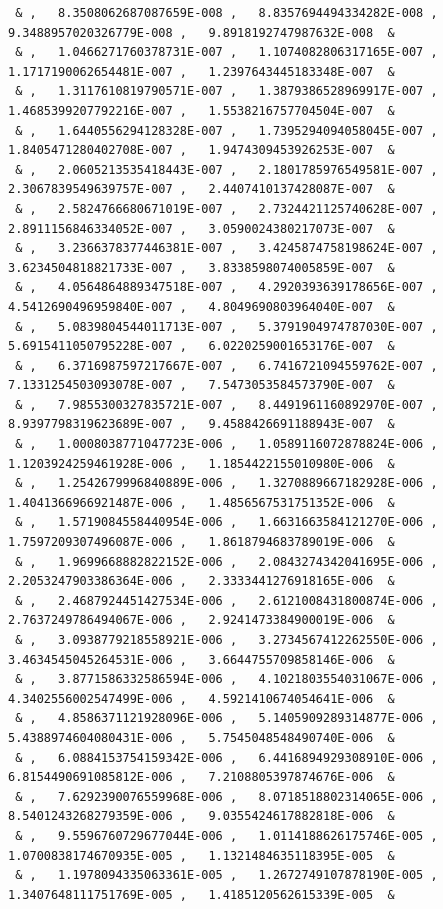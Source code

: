 \documentclass[a4paper,10pt]{report}
\begin{document}
{\begin{verbatim}
 & ,   8.3508062687087659E-008 ,   8.8357694494334282E-008 ,   9.3488957020326779E-008 ,   9.8918192747987632E-008  &
 & ,   1.0466271760378731E-007 ,   1.1074082806317165E-007 ,   1.1717190062654481E-007 ,   1.2397643445183348E-007  &
 & ,   1.3117610819790571E-007 ,   1.3879386528969917E-007 ,   1.4685399207792216E-007 ,   1.5538216757704504E-007  &
 & ,   1.6440556294128328E-007 ,   1.7395294094058045E-007 ,   1.8405471280402708E-007 ,   1.9474309453926253E-007  &
 & ,   2.0605213535418443E-007 ,   2.1801785976549581E-007 ,   2.3067839549639757E-007 ,   2.4407410137428087E-007  &
 & ,   2.5824766680671019E-007 ,   2.7324421125740628E-007 ,   2.8911156846334052E-007 ,   3.0590024380217073E-007  &
 & ,   3.2366378377446381E-007 ,   3.4245874758198624E-007 ,   3.6234504818821733E-007 ,   3.8338598074005859E-007  &
 & ,   4.0564864889347518E-007 ,   4.2920393639178656E-007 ,   4.5412690496959840E-007 ,   4.8049690803964040E-007  &
 & ,   5.0839804544011713E-007 ,   5.3791904974787030E-007 ,   5.6915411050795228E-007 ,   6.0220259001653176E-007  &
 & ,   6.3716987597217667E-007 ,   6.7416721094559762E-007 ,   7.1331254503093078E-007 ,   7.5473053584573790E-007  &
 & ,   7.9855300327835721E-007 ,   8.4491961160892970E-007 ,   8.9397798319623689E-007 ,   9.4588426691188943E-007  &
 & ,   1.0008038771047723E-006 ,   1.0589116072878824E-006 ,   1.1203924259461928E-006 ,   1.1854422155010980E-006  &
 & ,   1.2542679996840889E-006 ,   1.3270889667182928E-006 ,   1.4041366966921487E-006 ,   1.4856567531751352E-006  &
 & ,   1.5719084558440954E-006 ,   1.6631663584121270E-006 ,   1.7597209307496087E-006 ,   1.8618794683789019E-006  &
 & ,   1.9699668882822152E-006 ,   2.0843274342041695E-006 ,   2.2053247903386364E-006 ,   2.3333441276918165E-006  &
 & ,   2.4687924451427534E-006 ,   2.6121008431800874E-006 ,   2.7637249786494067E-006 ,   2.9241473384900019E-006  &
 & ,   3.0938779218558921E-006 ,   3.2734567412262550E-006 ,   3.4634545045264531E-006 ,   3.6644755709858146E-006  &
 & ,   3.8771586332586594E-006 ,   4.1021803554031067E-006 ,   4.3402556002547499E-006 ,   4.5921410674054641E-006  &
 & ,   4.8586371121928096E-006 ,   5.1405909289314877E-006 ,   5.4388974604080431E-006 ,   5.7545048548490740E-006  &
 & ,   6.0884153754159342E-006 ,   6.4416894929308910E-006 ,   6.8154490691085812E-006 ,   7.2108805397874676E-006  &
 & ,   7.6292390076559968E-006 ,   8.0718518802314065E-006 ,   8.5401243268279359E-006 ,   9.0355424617882818E-006  &
 & ,   9.5596760729677044E-006 ,   1.0114188626175746E-005 ,   1.0700838174670935E-005 ,   1.1321484635118395E-005  &
 & ,   1.1978094335063361E-005 ,   1.2672749107878190E-005 ,   1.3407648111751769E-005 ,   1.4185120562615339E-005  &

\end{verbatim}}
\end{document}
